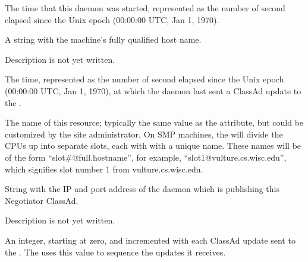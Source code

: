 \begin{description}

\item[\AdAttr{DaemonStartTime}:] The time that this daemon was
  started, represented as the number of second elapsed since
    the Unix epoch (00:00:00 UTC, Jan 1, 1970).

\item[\AdAttr{Machine}:] A string with the machine's fully qualified 
  host name.

\item[\AdAttr{MyAddress}:] Description is not yet written.

\item[\AdAttr{MyCurrentTime}:]  The time, represented as the number of 
  second elapsed since the Unix epoch (00:00:00 UTC, Jan 1, 1970),
  at which the  daemon last sent a ClassAd update to the
  .

\item[\AdAttr{Name}:] The name of this resource; typically the same value as
  the  attribute, but could be customized by the site
  administrator.
  On SMP machines, the  will divide the CPUs up into separate
  slots, each with with a unique name.
  These names will be of the form ``slot\#@full.hostname'', for example,
  ``slot1@vulture.cs.wisc.edu'', which signifies slot number 1 from
  vulture.cs.wisc.edu.

\item[\AdAttr{NegotiatorIpAddr}:] String with the IP and port address of the
 daemon which is publishing this Negotiator ClassAd.

\item[\AdAttr{PublicNetworkIpAddr}:] Description is not yet written.

\item[\AdAttr{UpdateSequenceNumber}:] An integer, starting at zero,
  and incremented with each ClassAd update sent to the .
  The  uses this value to sequence the updates it
  receives.


\end{description}
